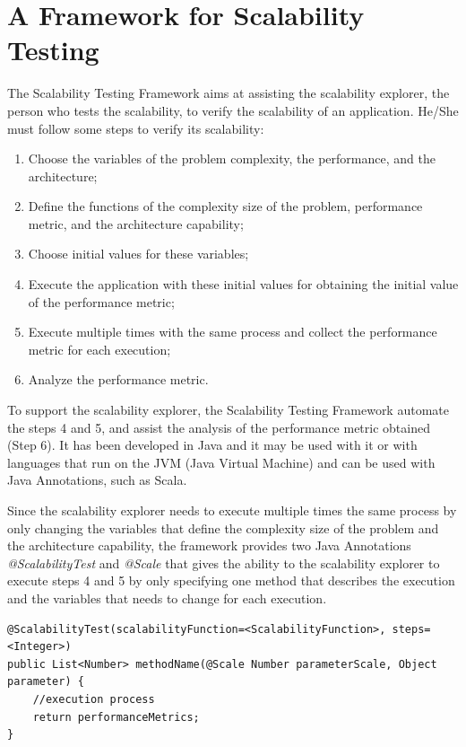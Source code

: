 \section{A Framework for Scalability Testing}

The Scalability Testing Framework aims at assisting the scalability explorer, the person who tests the scalability, to verify the scalability of an application. He/She must follow some steps to verify its scalability:

\begin{enumerate}
\item Choose the variables of the problem complexity, the performance, and the architecture;
\item Define the functions of the complexity size of the problem, performance metric, and the architecture capability;
\item Choose initial values for these variables;
\item Execute the application with these initial values for obtaining the initial value of the performance metric;
\item Execute multiple times with the same process and collect the performance metric for each execution;
\item Analyze the performance metric.
\end{enumerate}

To support the scalability explorer, the Scalability Testing Framework automate the steps 4 and 5, and assist the analysis of the performance metric obtained (Step 6). It has been developed in Java and it may be used with it or with languages that run on the JVM (Java Virtual Machine) and can be used with Java Annotations, such as Scala.

Since the scalability explorer needs to execute multiple times the same process by only changing the variables that define the complexity size of the problem and the architecture capability, the framework provides two Java Annotations \emph{@ScalabilityTest} and \emph{@Scale} that gives the ability to the scalability explorer to execute steps 4 and 5 by only specifying one method that describes the execution and the variables that needs to change for each execution.

\begin{lstlisting}
@ScalabilityTest(scalabilityFunction=<ScalabilityFunction>, steps=<Integer>)
public List<Number> methodName(@Scale Number parameterScale, Object parameter) {
	//execution process
	return performanceMetrics;
}

\end{lstlisting}

